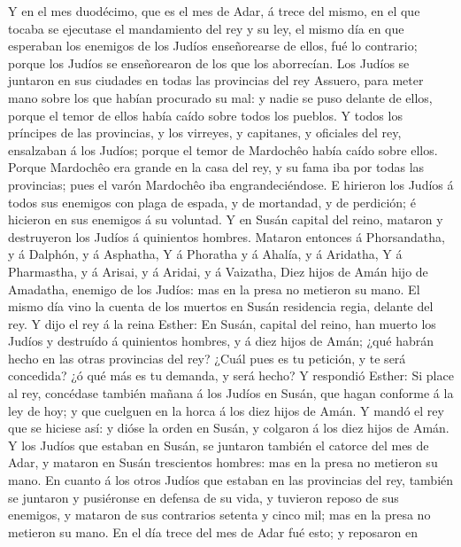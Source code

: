  Y en el mes duodécimo, que es el mes de Adar, á trece del
mismo, en el que tocaba se ejecutase el mandamiento del rey y su ley, el
mismo día en que esperaban los enemigos de los Judíos enseñorearse de
ellos, fué lo contrario; porque los Judíos se enseñorearon de los que
los aborrecían.  Los Judíos se juntaron en sus ciudades en
todas las provincias del rey Assuero, para meter mano sobre los que
habían procurado su mal: y nadie se puso delante de ellos, porque el
temor de ellos había caído sobre todos los pueblos.  Y
todos los príncipes de las provincias, y los virreyes, y capitanes, y
oficiales del rey, ensalzaban á los Judíos; porque el temor de Mardochêo
había caído sobre ellos.  Porque Mardochêo era grande en
la casa del rey, y su fama iba por todas las provincias; pues el varón
Mardochêo iba engrandeciéndose.  E hirieron los Judíos á
todos sus enemigos con plaga de espada, y de mortandad, y de perdición;
é hicieron en sus enemigos á su voluntad.  Y en Susán
capital del reino, mataron y destruyeron los Judíos á quinientos
hombres.  Mataron entonces á Phorsandatha, y á Dalphón, y
á Asphatha,  Y á Phoratha y á Ahalía, y á Aridatha,
 Y á Pharmastha, y á Arisai, y á Aridai, y á Vaizatha,
 Diez hijos de Amán hijo de Amadatha, enemigo de los
Judíos: mas en la presa no metieron su mano.  El mismo
día vino la cuenta de los muertos en Susán residencia regia, delante del
rey.  Y dijo el rey á la reina Esther: En Susán, capital
del reino, han muerto los Judíos y destruído á quinientos hombres, y á
diez hijos de Amán; ¿qué habrán hecho en las otras provincias del rey?
¿Cuál pues es tu petición, y te será concedida? ¿ó qué más es tu
demanda, y será hecho?  Y respondió Esther: Si place al
rey, concédase también mañana á los Judíos en Susán, que hagan conforme
á la ley de hoy; y que cuelguen en la horca á los diez hijos de Amán.
 Y mandó el rey que se hiciese así: y dióse la orden en
Susán, y colgaron á los diez hijos de Amán.  Y los Judíos
que estaban en Susán, se juntaron también el catorce del mes de Adar, y
mataron en Susán trescientos hombres: mas en la presa no metieron su
mano.  En cuanto á los otros Judíos que estaban en las
provincias del rey, también se juntaron y pusiéronse en defensa de su
vida, y tuvieron reposo de sus enemigos, y mataron de sus contrarios
setenta y cinco mil; mas en la presa no metieron su mano.
 En el día trece del mes de Adar fué esto; y reposaron en
